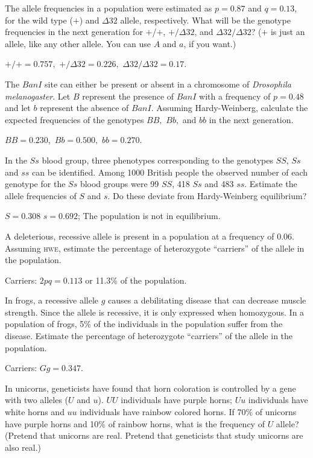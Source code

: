 \documentclass[12pt]{exam}
\newcommand*\AnswerBox[2]{%
    \parbox[t][#1]{0.92\textwidth}{%
    \begin{solution}#2\end{solution}}
}
\begin{document}
\begin{questions}

\question
The allele frequencies in a population were estimated as $p = 0.87$ and $q = 0.13$, 
for the wild type ($+$) and $Δ32$ allele, respectively. What will be the genotype 
frequencies in the next generation for $+$/$+$, $+/Δ32$, and $Δ32/Δ32$? 
($+$ is just an allele, like any other allele. You can use $A$ and $a$, if you want.)

\AnswerBox{2\baselineskip}{$+/+ = 0.757,$ \quad $+/Δ32 = 0.226,$ \quad $Δ32/Δ32 = 0.17.$}


\question
The $BanI$ site can either be present or absent in a chromosome of \textit{Drosophila melanogaster}.
Let $B$ represent the presence of $BanI$ with a frequency of $p = 0.48$ and let $b$ 
represent the absence of $BanI.$ Assuming Hardy-Weinberg, calculate the expected frequencies of the genotypes $BB,$ $Bb,$ and $bb$ in the next generation.

\AnswerBox{2\baselineskip}{$BB = 0.230,$ \quad $Bb = 0.500,$ \quad $bb = 0.270.$}

\question
In the $Ss$ blood group, three phenotypes corresponding to the genotypes $SS$, $Ss$
and $ss$ can be identified. Among 1000 British people the observed number of each 
genotype for the $Ss$ blood groups were 99 $SS$, 418 $Ss$ and 483 $ss$.  Estimate 
the allele frequencies of $S$ and $s$.  Do these deviate from Hardy-Weinberg equilibrium?

\AnswerBox{2\baselineskip}{$S = 0.308$ \quad $s = 0.692$; The population is not in equilibrium.}

\question
A deleterious, recessive allele is present in a population at a frequency of 0.06. 
Assuming \textsc{hwe}, estimate the percentage of heterozygote “carriers” of the allele 
in the population. 

\AnswerBox{2\baselineskip}{Carriers: $2pq = 0.113$ or 11.3\% of the population.}

\question
In frogs, a recessive allele $g$ causes a debilitating disease that can decrease muscle strength.  Since the allele is recessive, it is only expressed when homozygous.  In a population of frogs, 5\% of the individuals in the population suffer from the disease.  Estimate the percentage of heterozygote “carriers” of the allele in the population.


\AnswerBox{2\baselineskip}{Carriers: $Gg = 0.347.$}

\question
In unicorns, geneticists have found that horn coloration is controlled by a gene with two alleles ($U$ and $u$). $UU$ individuals have purple horns; $Uu$ individuals have white horns and $uu$ individuals have rainbow colored horns.  If 70\% of unicorns have purple horns and 10\% of rainbow horns, what is the frequency of $U$ allele? (Pretend that unicorns are real. Pretend that geneticists that study unicorns are also real.)


\end{questions}
\end{document}
